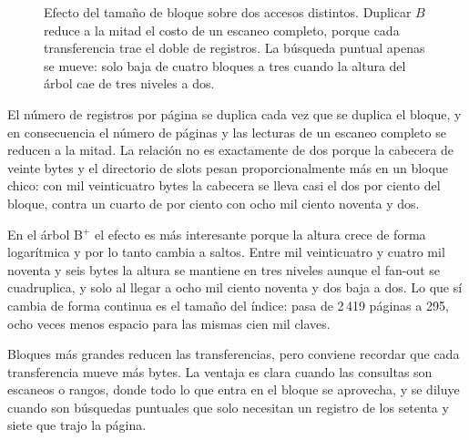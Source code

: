 \documentclass[a4paper,12pt]{article}
\begin{document}
\begin{figure}[H]
\centering
{}
\caption{Efecto del tamaño de bloque sobre dos accesos distintos. Duplicar $B$
reduce a la mitad el costo de un escaneo completo, porque cada transferencia
trae el doble de registros. La búsqueda puntual apenas se mueve: solo baja de
cuatro bloques a tres cuando la altura del árbol cae de tres niveles a dos.}
\label{fig:e4}
\end{figure}

El número de registros por página se duplica cada vez que se duplica el bloque,
y en consecuencia el número de páginas y las lecturas de un escaneo completo se
reducen a la mitad. La relación no es exactamente de dos porque la cabecera de
veinte bytes y el directorio de slots pesan proporcionalmente más en un bloque
chico: con mil veinticuatro bytes la cabecera se lleva casi el dos por ciento
del bloque, contra un cuarto de por ciento con ocho mil ciento noventa y dos.

En el árbol B$^+$ el efecto es más interesante porque la altura crece de forma
logarítmica y por lo tanto cambia a saltos. Entre mil veinticuatro y cuatro mil
noventa y seis bytes la altura se mantiene en tres niveles aunque el fan-out se
cuadruplica, y solo al llegar a ocho mil ciento noventa y dos baja a dos. Lo que
sí cambia de forma continua es el tamaño del índice: pasa de 2\,419 páginas a
295, ocho veces menos espacio para las mismas cien mil claves.

Bloques más grandes reducen las transferencias, pero conviene recordar que cada
transferencia mueve más bytes. La ventaja es clara cuando las consultas son
escaneos o rangos, donde todo lo que entra en el bloque se aprovecha, y se
diluye cuando son búsquedas puntuales que solo necesitan un registro de los
setenta y siete que trajo la página.
\end{document}
